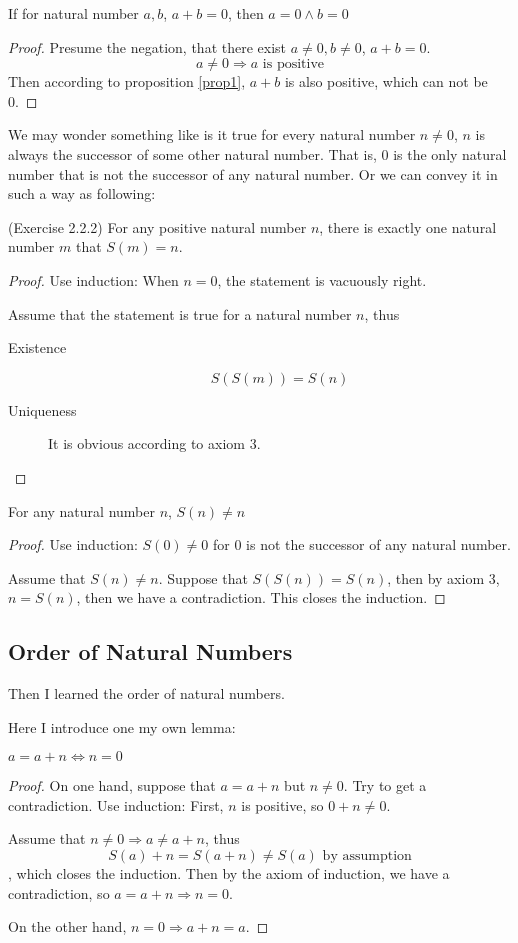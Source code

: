 \begin{coro}
If for natural number $a,b$, $a+b=0$, then $a=0 \wedge b=0$ \label{coro1}
\end{coro}
\begin{proof}
Presume the negation, that there exist $a \neq 0, b \neq 0$, $a+b=0$. 
\[
a \neq 0 \Longrightarrow a \text{ is positive}
\]
Then according to proposition \ref{prop1}, $a+b$ is also positive, which can not be 0. \qedhere
\end{proof}

We may wonder something like is it true for every natural number $n \neq 0$, $n$ is always the 
successor of some other natural number. That is, 0 is the only natural number that is not the successor 
of any natural number. Or we can convey it in such a way as following: 
\begin{prop}
(Exercise 2.2.2) \label{exercise2.2.2}
For any positive natural number $n$, there is exactly one natural number $m$ that $S(m) = n$. 
\label{prop5}
\end{prop} 

\begin{proof}
Use induction: When $n=0$, the statement is vacuously right.

Assume that the statement is true for a natural number $n$, thus
\begin{description}
\item[Existence] 
\[
S(S(m)) = S(n)
\]
\item[Uniqueness]
It is obvious according to axiom 3.
\end{description}
\end{proof}

\begin{prop}
For any natural number $n$, $S(n) \neq n$
\end{prop}
\begin{proof}
Use induction: $S(0) \neq 0$ for 0 is not the successor of any natural number.

Assume that $S(n) \neq n$. Suppose that $S(S(n)) = S(n)$, then by axiom 3, $n=S(n)$, then we have a 
contradiction. This closes the induction. \qedhere
\end{proof}

\subsection{Order of Natural Numbers}
Then I learned the order of natural numbers.

Here I introduce one my own lemma:
\begin{lem}
$a=a+n \Longleftrightarrow n=0$  \label{lem3}
\end{lem}
\begin{proof}
On one hand, suppose that $a=a+n$ but $n \neq 0$. Try to get a contradiction. Use induction:
First, $n$ is positive, so $0+n \neq 0$.

Assume that $n \neq 0 \Longrightarrow a \neq a+n$, thus 
\[
S(a)+n=S(a+n) \neq S(a) \text{ by assumption}
\], which closes the induction. Then by the axiom of induction, we have a contradiction, so 
$a=a+n \Longrightarrow n=0$.

On the other hand, $n=0 \Longrightarrow a+n=a$. \qedhere
\end{proof}

